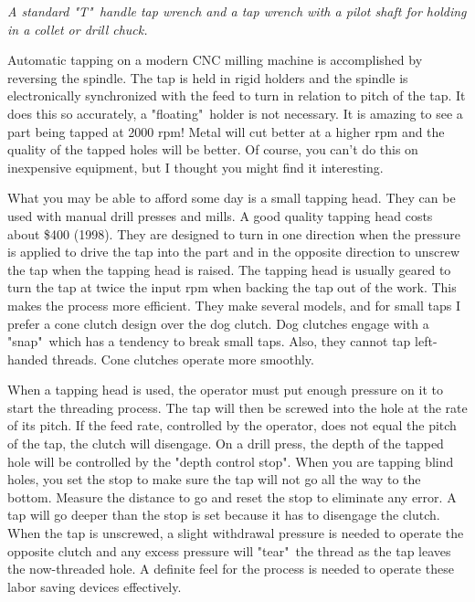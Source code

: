 \bigskip
\textit{A standard "T"\ handle tap wrench and a tap wrench with a pilot shaft
for holding in a collet or drill chuck.}
\bigskip


Automatic tapping on a modern CNC milling machine is accomplished by reversing
the spindle. The tap is held in rigid holders and the spindle is electronically
synchronized with the feed to turn in relation to pitch of the tap. It does this
so accurately, a "floating"\ holder is not necessary. It is amazing to see a
part being tapped at 2000 rpm! Metal will cut better at a higher rpm and the
quality of the tapped holes will be better. Of course, you can't do this on
inexpensive equipment, but I thought you might find it interesting.


What you may be able to afford some day is a small tapping head. They can be
used with manual drill presses and mills. A good quality tapping head costs
about \$400 (1998). They are designed to turn in one direction when the pressure
is applied to drive the tap into the part and in the opposite direction to
unscrew the tap when the tapping head is raised. The tapping head is usually
geared to turn the tap at twice the input rpm when backing the tap out of the
work. This makes the process more efficient. They make several models, and for
small taps I prefer a cone clutch design over the dog clutch. Dog clutches
engage with a "snap"\ which has a tendency to break small taps. Also, they
cannot tap left-handed threads. Cone clutches operate more smoothly.

When a tapping head is used, the operator must put enough pressure on it to
start the threading process. The tap will then be screwed into the hole at the
rate of its pitch. If the feed rate, controlled by the operator, does not equal
the pitch of the tap, the clutch will disengage. On a drill press, the depth of
the tapped hole will be controlled by the "depth control stop". When you are
tapping blind holes, you set the stop to make sure the tap will not go all the
way to the bottom. Measure the distance to go and reset the stop to eliminate
any error. A tap will go deeper than the stop is set because it has to disengage
the clutch. When the tap is unscrewed, a slight withdrawal pressure is needed to
operate the opposite clutch and any excess pressure will "tear"\ the thread as
the tap leaves the now-threaded hole. A definite feel for the process is needed
to operate these labor saving devices effectively.


